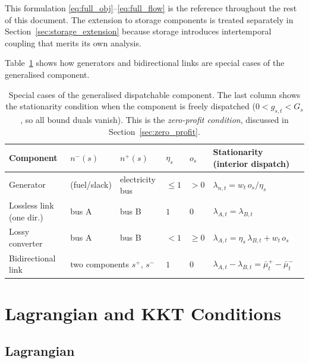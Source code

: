\documentclass{article}
\begin{document}
This formulation \eqref{eq:full_obj}--\eqref{eq:full_flow} is the reference
throughout the rest of this document. The extension to storage components is
treated separately in Section~\ref{sec:storage_extension} because storage
introduces intertemporal coupling that merits its own analysis.

Table~\ref{tab:special_cases} shows how generators and bidirectional links
are special cases of the generalised component.

\begin{table}[h!]
\centering
\renewcommand{\arraystretch}{1.5}
\begin{tabular}{llllll}
\toprule
\textbf{Component} & $n^-(s)$ & $n^+(s)$ & $\eta_s$ & $o_s$
    & \textbf{Stationarity (interior dispatch)} \\
\midrule
Generator &
    (fuel/slack) & electricity bus & $\le 1$ & $> 0$ &
    $\lambda_{n,t} = w_t\, o_s / \eta_s$ \\
Lossless link (one dir.) &
    bus A & bus B & $1$ & $0$ &
    $\lambda_{A,t} = \lambda_{B,t}$ \\
Lossy converter &
    bus A & bus B & $< 1$ & $\ge 0$ &
    $\lambda_{A,t} = \eta_s\,\lambda_{B,t} + w_t\, o_s$ \\
Bidirectional link &
    \multicolumn{2}{l}{two components $s^+$, $s^-$} & $1$ & $0$ &
    $\lambda_{A,t} - \lambda_{B,t} = \bar{\mu}^+_t - \bar{\mu}^-_t$ \\
\bottomrule
\end{tabular}
\caption{Special cases of the generalised dispatchable component.
The last column shows the stationarity condition when the component is
freely dispatched ($0 < g_{s,t} < G_s$, so all bound duals vanish).
This is the \emph{zero-profit condition}, discussed in
Section~\ref{sec:zero_profit}.}
\label{tab:special_cases}
\end{table}

\section{Lagrangian and KKT Conditions}
\label{sec:kkt}

\subsection{Lagrangian}
\end{document}
